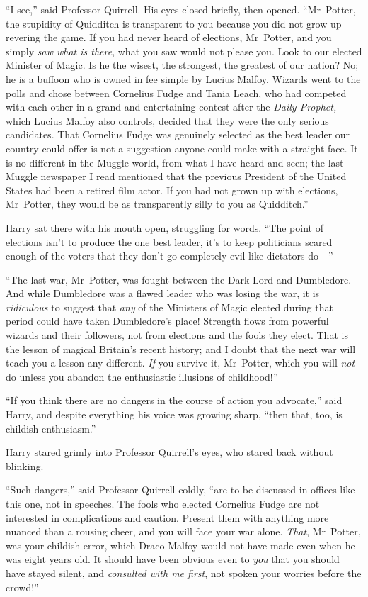“I see,” said Professor Quirrell. His eyes closed briefly, then opened. “Mr~Potter, the stupidity of Quidditch is transparent to you because you did not grow up revering the game. If you had never heard of elections, Mr~Potter, and you simply \emph{saw what is there}, what you saw would not please you. Look to our elected Minister of Magic. Is he the wisest, the strongest, the greatest of our nation? No; he is a buffoon who is owned in fee simple by Lucius Malfoy. Wizards went to the polls and chose between Cornelius Fudge and Tania Leach, who had competed with each other in a grand and entertaining contest after the \emph{Daily Prophet,} which Lucius Malfoy also controls, decided that they were the only serious candidates. That Cornelius Fudge was genuinely selected as the best leader our country could offer is not a suggestion anyone could make with a straight face. It is no different in the Muggle world, from what I have heard and seen; the last Muggle newspaper I read mentioned that the previous President of the United States had been a retired film actor. If you had not grown up with elections, Mr~Potter, they would be as transparently silly to you as Quidditch.”

Harry sat there with his mouth open, struggling for words. “The point of elections isn’t to produce the one best leader, it’s to keep politicians scared enough of the voters that they don’t go completely evil like dictators do—”

“The last war, Mr~Potter, was fought between the Dark Lord and Dumbledore. And while Dumbledore was a flawed leader who was losing the war, it is \emph{ridiculous} to suggest that \emph{any} of the Ministers of Magic elected during that period could have taken Dumbledore’s place! Strength flows from powerful wizards and their followers, not from elections and the fools they elect. That is the lesson of magical Britain’s recent history; and I doubt that the next war will teach you a lesson any different. \emph{If} you survive it, Mr~Potter, which you will \emph{not} do unless you abandon the enthusiastic illusions of childhood!”

“If you think there are no dangers in the course of action you advocate,” said Harry, and despite everything his voice was growing sharp, “then that, too, is childish enthusiasm.”

Harry stared grimly into Professor Quirrell’s eyes, who stared back without blinking.

“Such dangers,” said Professor Quirrell coldly, “are to be discussed in offices like this one, not in speeches. The fools who elected Cornelius Fudge are not interested in complications and caution. Present them with anything more nuanced than a rousing cheer, and you will face your war alone. \emph{That}, Mr~Potter, was your childish error, which Draco Malfoy would not have made even when he was eight years old. It should have been obvious even to \emph{you} that you should have stayed silent, and \emph{consulted with me first}, not spoken your worries before the crowd!”

